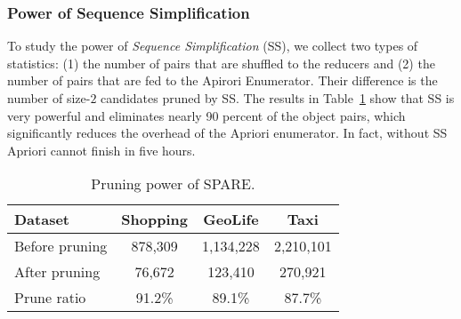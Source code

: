 \subsubsection{Power of Sequence Simplification}
To study the power of \emph{Sequence Simplification} (SS),
we collect two types of statistics: (1) the number of pairs that
are shuffled to the reducers and (2) the number of pairs that
are fed to the Apirori Enumerator. 
Their difference %
is the number of size-$2$ candidates pruned by SS.
The results in Table~\ref{tbl:pruning} show that %
SS is very powerful and eliminates nearly 90 percent of the object pairs, 
which significantly reduces the overhead of %
the Apriori enumerator.
In fact, without SS Apriori cannot
finish in five hours.



\begin{table}[h]
\centering
\caption{Pruning power of SPARE.}
\label{tbl:pruning}
\begin{tabular}{|l|c|c|c|}
\hline 
\textbf{Dataset} & \textbf{Shopping} & \textbf{GeoLife} & \textbf{Taxi} \\ 
\hline 
Before pruning & 878,309 &  1,134,228 & 2,210,101 \\ 
\hline 
After pruning & 76,672 & 123,410 & 270,921 \\ 
\hline 
Prune ratio & 91.2\% & 89.1\% & 87.7\% \\ 
\hline 
\end{tabular} 
\end{table}

